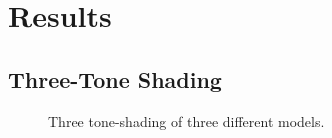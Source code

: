 \section{Results}

  \subsection{Three-Tone Shading}

    \begin{figure}
      \centering



      \caption{Three tone-shading of three different models.}
      \label{three-tone}
    \end{figure}

